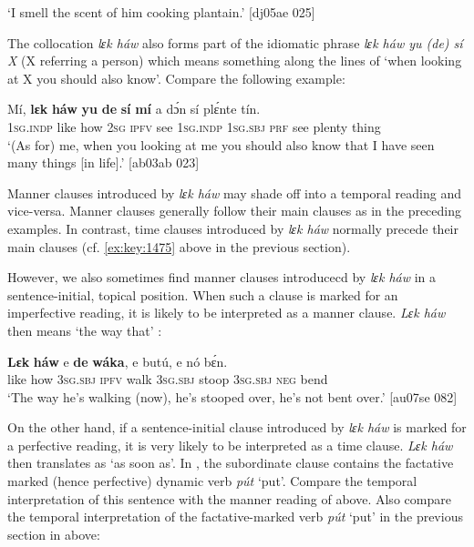 \glt ‘I smell the scent of him cooking plantain.’ [dj05ae 025]
\z

The collocation \textit{lɛk háw} also forms part of the idiomatic phrase \textit{lɛk háw yu (de) sí X} (X referring a person) which means something along the lines of ‘when looking at X you should also know’. Compare the following example: 


\ea%
    \label{ex:key:1485}
    \gll Mí,    \textbf{lɛk}  \textbf{háw}    \textbf{yu}  \textbf{de}  \textbf{sí}  \textbf{mí}    a    dɔ́n  sí  plɛ́nte  tín.\\
\textsc{1sg.indp}  like  how    \textsc{2sg}  \textsc{ipfv}  see  \textsc{1sg.indp}  \textsc{1sg.sbj}  \textsc{prf}  see  plenty  thing\\

\glt ‘(As for) me, when you looking at me you should also know that I have seen many 
 things [in life].’ [ab03ab 023]
\z

Manner clauses introduced by \textit{lɛk háw} may shade off into a temporal reading and vice-versa. Manner clauses generally follow their main clauses as in the preceding examples. In contrast, time clauses introduced by\textit{ lɛk háw} normally precede their main clauses (cf. \ref{ex:key:1475} above in the previous section).


However, we also sometimes find manner clauses introducecd by \textit{lɛk háw} in a sentence-initial, topical position. When such a clause is marked for an imperfective reading, it is likely to be interpreted as a manner clause. \textit{Lɛk háw} then means ‘the way that’ : 



\ea%
    \label{ex:key:1486}
    \gll \textbf{Lɛk}  \textbf{háw}    e    \textbf{de}  \textbf{wáka},  e    butú,  e    nó  bɛ́n.\\
like  how    \textsc{3sg.sbj}  \textsc{ipfv}  walk  \textsc{3sg.sbj}  stoop  \textsc{3sg.sbj}  \textsc{neg}  bend\\

\glt ‘The way he’s walking (now), he’s stooped over, he’s not bent over.’ [au07se 082]
\z

On the other hand, if a sentence-initial clause introduced by \textit{lɛk háw} is marked for a perfective reading, it is very likely to be interpreted as a time clause. \textit{Lɛk háw} then translates as ‘as soon as’. In , the subordinate clause contains the factative marked (hence perfective) dynamic verb \textit{pút} ‘put’. Compare the temporal interpretation of this sentence with the manner reading of  above. Also compare the temporal interpretation of the factative-marked verb \textit{pút} ‘put’ in the previous section in  above:


